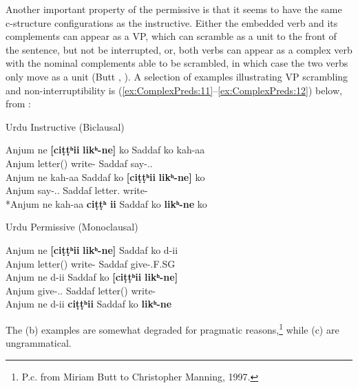 \documentclass[output=paper,hidelinks]{langscibook}
\begin{document}
Another important property of the permissive is that it seems to have the same
c-structure configurations as the instructive.  Either the embedded verb and
its complements can appear as a VP, which can scramble as a unit to the front of the
sentence, but not be interrupted, or, both verbs can appear as a complex verb
with the nominal complements able to be scrambled, in which case the two verbs only move
as a unit (Butt \citeyear[43--47]{Butt1995}, \citeyear[113--115]{Butt1997}). A selection
of examples illustrating VP scrambling and non-interruptibility is  (\ref{ex:ComplexPreds:11}--\ref{ex:ComplexPreds:12}) below, from 
\citet[23]{AndrewsManning1999}:

\ea\label{ex:ComplexPreds:11}
Urdu Instructive (Biclausal)
\begin{xlist}
\ex
\gll Anjum ne \textbf{[ciṭṭʰii}  \textbf{likʰ-ne]} ko Saddaf ko kah-aa\\
Anjum {\ERG}  letter({\NOM}) write-{\INF} {\ACC} Saddaf {\DAT} say-{\PRF.\M.\SG}\\
\ex
\gll Anjum ne kah-aa Saddaf ko \textbf{[ciṭṭʰii} \textbf{likʰ-ne]} ko\\
  Anjum {\ERG} say-{\PRF.\M.\SG} Saddaf {\DAT} letter.{\NOM} write-{\INF} {\ACC}\\
\ex
*Anjum ne kah-aa \textbf{ciṭṭʰ ii} Saddaf ko \textbf{likʰ-ne} ko 
\end{xlist}
\z
\ea \label{ex:ComplexPreds:12}
Urdu Permissive (Monoclausal)
\begin{xlist}
\ex
\gll Anjum ne \textbf{[ciṭṭʰii}  \textbf{likʰ-ne]} Saddaf ko d-ii\\
  Anjum {\ERG} letter({\NOM}) write-{\INF} Saddaf {\DAT} give-{\PRF.F.SG}\\
\ex
\gll Anjum ne d-ii Saddaf ko \textbf{[ciṭṭʰii} \textbf{likʰ-ne]}\\
  Anjum {\ERG} give-{\PRF.\F.\SG} Saddaf {\DAT} letter({\NOM}) write-{\INF}\\
\ex *Anjum ne d-ii \textbf{ciṭṭʰii} Saddaf ko \textbf{likʰ-ne}
\end{xlist}
\z\clearpage
The (b) examples are somewhat degraded for pragmatic reasons,\footnote
 {P.c. from Miriam Butt to Christopher Manning, 1997.}
while (c) are ungrammatical.
\end{document}
